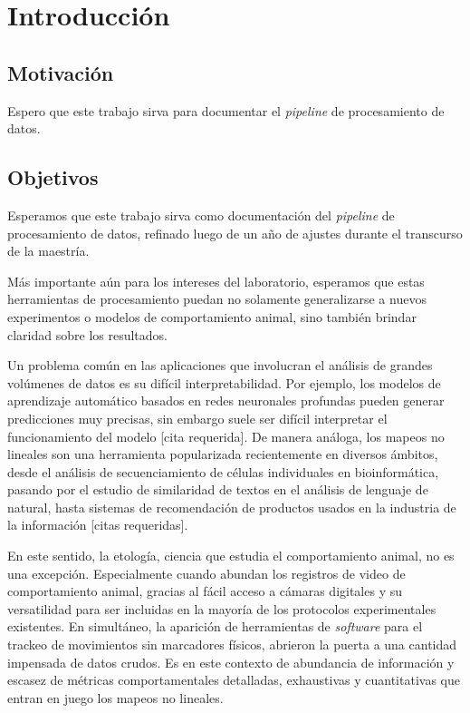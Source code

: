 \chapter*{Introducción}\label{cha:introduccion}

\section{Motivación}\label{sec:motivacion}

Espero que este trabajo sirva para documentar el \textit{pipeline} de procesamiento de datos.

\section{Objetivos}\label{sec:motivacion}

Esperamos que este trabajo sirva como documentación del \textit{pipeline} de procesamiento de datos, refinado luego de un año de ajustes durante el transcurso de la maestría.

Más importante aún para los intereses del laboratorio, esperamos que estas herramientas de procesamiento puedan no solamente generalizarse a nuevos experimentos o modelos de comportamiento animal, sino también brindar claridad sobre los resultados.

Un problema común en las aplicaciones que involucran el análisis de grandes volúmenes de datos es su difícil interpretabilidad. Por ejemplo, los modelos de aprendizaje automático basados en redes neuronales profundas pueden generar predicciones muy precisas, sin embargo suele ser difícil interpretar el funcionamiento del modelo [cita requerida]. De manera análoga, los mapeos no lineales son una herramienta popularizada recientemente en diversos ámbitos, desde el análisis de secuenciamiento de células individuales en bioinformática, pasando por el estudio de similaridad de textos en el análisis de lenguaje de natural, hasta sistemas de recomendación de productos usados en la industria de la información [citas requeridas].

En este sentido, la etología, ciencia que estudia el comportamiento animal, no es una excepción. Especialmente cuando abundan los registros de video de comportamiento animal, gracias al fácil acceso a cámaras digitales y su versatilidad para ser incluidas en la mayoría de los protocolos experimentales existentes. En simultáneo, la aparición de herramientas de \textit{software} para el trackeo de movimientos sin marcadores físicos, abrieron la puerta a una cantidad impensada de datos crudos. Es en este contexto de abundancia de información y escasez de métricas comportamentales detalladas, exhaustivas y cuantitativas que entran en juego los mapeos no lineales.

